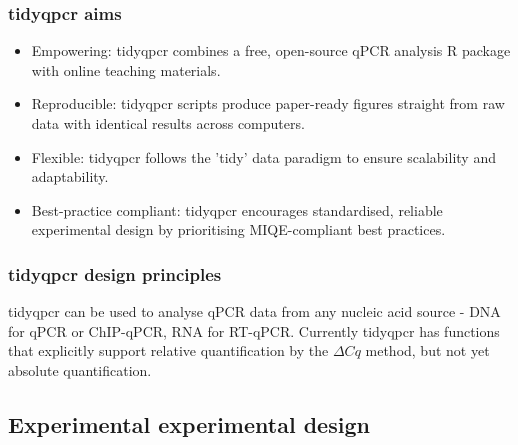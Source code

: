 \documentclass{SBCbookchapter}
\begin{document}
\subsubsection{tidyqpcr aims}

\begin{itemize}
    \item Empowering: tidyqpcr combines a free, open-source qPCR analysis R package with online teaching materials.
    \item Reproducible: tidyqpcr scripts produce paper-ready figures straight from raw data with identical results across computers.
    \item Flexible: tidyqpcr follows the 'tidy' data paradigm to ensure scalability and adaptability.
    \item Best-practice compliant: tidyqpcr encourages standardised, reliable experimental design by prioritising MIQE-compliant best practices.
\end{itemize}

\subsubsection{tidyqpcr design principles}

tidyqpcr can be used to analyse qPCR data from any nucleic acid source - DNA for qPCR or ChIP-qPCR, RNA for RT-qPCR. Currently tidyqpcr has functions that explicitly support relative quantification by the $\Delta Cq$ method, but not yet absolute quantification.

\subsection{Experimental experimental design}
\end{document}
